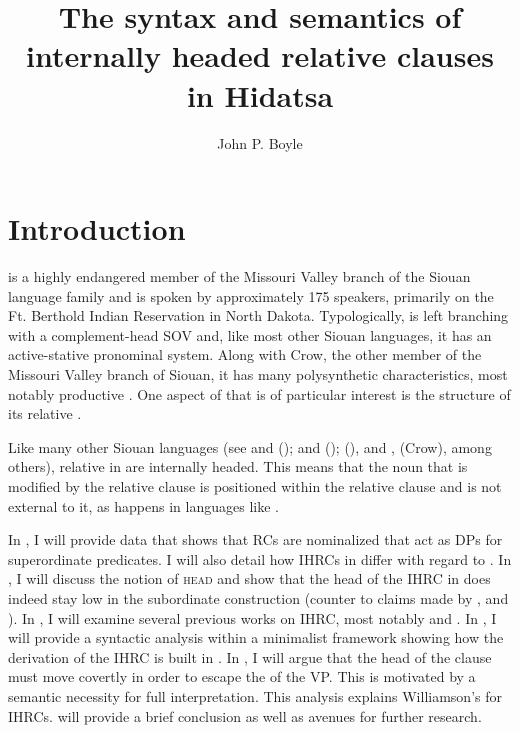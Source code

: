 \documentclass[output=paper]{LSP/langsci}
\author{John P. Boyle}
\title{The syntax and semantics of internally headed relative clauses in {Hidatsa}}
\begin{document}
\section{Introduction}  

 is a highly endangered member of the Missouri Valley branch of the Siouan language family and is spoken by approximately 175 speakers, primarily on the Ft. Berthold Indian Reservation in North Dakota. Typologically,  is left branching with a complement-head SOV  and, like most other Siouan languages, it has an active-stative pronominal system. Along with Crow, the other member of the Missouri Valley branch of Siouan, it has many polysynthetic characteristics, most notably productive  \citep{Rankinetal2003, Boyle2007}. One aspect of  that is of particular interest is the structure of its relative .
	
Like many other Siouan languages (see \citealt{Drummond1976} and \citealt{Cumberland2005} (); \citealt{Williamson1987} and \citealt{RoodTaylor1996} (); \citealt{Quintero2004} (), and \citealt{Graczyk1991b}, \citeyear{Graczyk2007} (Crow), among others), relative  in  are internally headed. This means that the noun that is modified by the relative clause is positioned within the relative clause and is not external to it, as happens in languages like .
	
In , I will provide data that shows that  RCs are nominalized  that act as DPs for superordinate predicates. I will also detail how IHRCs in  differ with regard to . In , I will discuss the notion of \textsc{head} and show that the head of the IHRC in  does indeed stay low in the subordinate construction (counter to claims made by \citet{Kayne1994}, \citet{Bianchi1999} and \citet{DiSciullo2005}). In , I will examine several previous works on IHRC, most notably \citet{Williamson1987} and \citet{Culy1990}. In , I will provide a syntactic analysis within a minimalist framework showing how the derivation of the IHRC is built in . In , I will argue that the head of the clause must move covertly in order to escape the  of the VP. This is motivated by a semantic necessity for full interpretation. This analysis explains Williamson's  for IHRCs.  will provide a brief conclusion as well as avenues for further research.
\end{document}
